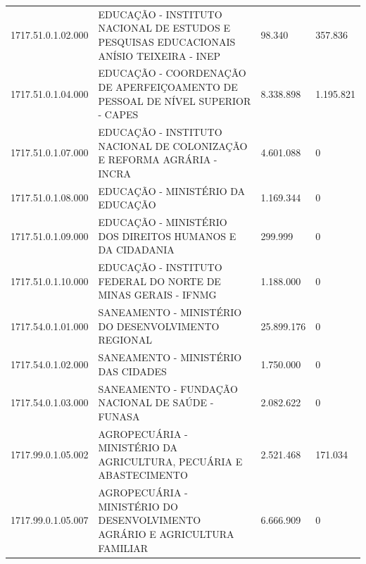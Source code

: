 \documentclass{article}
\begin{document}
\begin{longtable}[c]{m{2cm}|m{11cm}|m{2cm}m{2cm}}
\multicolumn{1}{C{2cm}|}{1717.51.0.1.02.000} & \multicolumn{1}{L{11cm}|}{EDUCAÇÃO - INSTITUTO NACIONAL DE ESTUDOS E PESQUISAS EDUCACIONAIS ANÍSIO TEIXEIRA - INEP} & \multicolumn{1}{R{2cm}|}{98.340} & \multicolumn{1}{R{2cm}}{357.836} \\
\multicolumn{1}{C{2cm}|}{1717.51.0.1.04.000} & \multicolumn{1}{L{11cm}|}{EDUCAÇÃO - COORDENAÇÃO DE APERFEIÇOAMENTO DE PESSOAL DE NÍVEL SUPERIOR - CAPES} & \multicolumn{1}{R{2cm}|}{8.338.898} & \multicolumn{1}{R{2cm}}{1.195.821} \\
\multicolumn{1}{C{2cm}|}{1717.51.0.1.07.000} & \multicolumn{1}{L{11cm}|}{EDUCAÇÃO - INSTITUTO NACIONAL DE COLONIZAÇÃO E REFORMA AGRÁRIA - INCRA} & \multicolumn{1}{R{2cm}|}{4.601.088} & \multicolumn{1}{R{2cm}}{            0} \\
\multicolumn{1}{C{2cm}|}{1717.51.0.1.08.000} & \multicolumn{1}{L{11cm}|}{EDUCAÇÃO - MINISTÉRIO DA EDUCAÇÃO} & \multicolumn{1}{R{2cm}|}{1.169.344} & \multicolumn{1}{R{2cm}}{            0} \\
\multicolumn{1}{C{2cm}|}{1717.51.0.1.09.000} & \multicolumn{1}{L{11cm}|}{EDUCAÇÃO - MINISTÉRIO DOS DIREITOS HUMANOS E DA CIDADANIA} & \multicolumn{1}{R{2cm}|}{299.999} & \multicolumn{1}{R{2cm}}{            0} \\
\multicolumn{1}{C{2cm}|}{1717.51.0.1.10.000} & \multicolumn{1}{L{11cm}|}{EDUCAÇÃO - INSTITUTO FEDERAL DO NORTE DE MINAS GERAIS - IFNMG} & \multicolumn{1}{R{2cm}|}{1.188.000} & \multicolumn{1}{R{2cm}}{            0} \\
\multicolumn{1}{C{2cm}|}{1717.54.0.1.01.000} & \multicolumn{1}{L{11cm}|}{SANEAMENTO - MINISTÉRIO DO DESENVOLVIMENTO REGIONAL} & \multicolumn{1}{R{2cm}|}{25.899.176} & \multicolumn{1}{R{2cm}}{            0} \\
\multicolumn{1}{C{2cm}|}{1717.54.0.1.02.000} & \multicolumn{1}{L{11cm}|}{SANEAMENTO - MINISTÉRIO DAS CIDADES} & \multicolumn{1}{R{2cm}|}{1.750.000} & \multicolumn{1}{R{2cm}}{            0} \\
\multicolumn{1}{C{2cm}|}{1717.54.0.1.03.000} & \multicolumn{1}{L{11cm}|}{SANEAMENTO - FUNDAÇÃO NACIONAL DE SAÚDE - FUNASA} & \multicolumn{1}{R{2cm}|}{2.082.622} & \multicolumn{1}{R{2cm}}{            0} \\
\multicolumn{1}{C{2cm}|}{1717.99.0.1.05.002} & \multicolumn{1}{L{11cm}|}{AGROPECUÁRIA - MINISTÉRIO DA AGRICULTURA, PECUÁRIA E ABASTECIMENTO} & \multicolumn{1}{R{2cm}|}{2.521.468} & \multicolumn{1}{R{2cm}}{171.034} \\
\multicolumn{1}{C{2cm}|}{1717.99.0.1.05.007} & \multicolumn{1}{L{11cm}|}{AGROPECUÁRIA - MINISTÉRIO DO DESENVOLVIMENTO AGRÁRIO E AGRICULTURA FAMILIAR} & \multicolumn{1}{R{2cm}|}{6.666.909} & \multicolumn{1}{R{2cm}}{            0} \\

\end{longtable}
\end{document}
